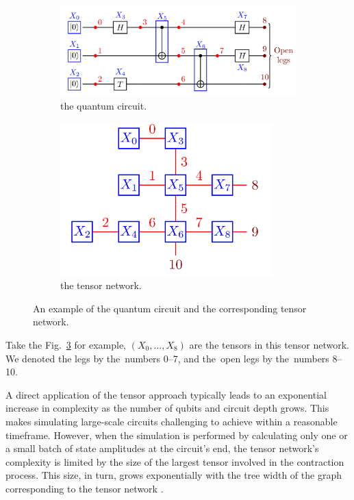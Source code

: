 \begin{figure}
    \centering
    \begin{subfigure}{0.5\textwidth}
        \centering
        \includegraphics[width=\textwidth]{images/6_3_circ.png}
        \caption{the quantum circuit.}
        \label{6_3_circ}
    \end{subfigure}
    \begin{subfigure}{0.4\textwidth}
        \centering
        \includegraphics[width=0.9\textwidth]{images/6_3_tn.png}
        \caption{the tensor network.}
        \label{6_3_tn}
    \end{subfigure}
    \caption{An example of the quantum circuit and the corresponding tensor network.}
    \label{fig:6_3_tn_circ}
\end{figure}

Take the Fig.~\ref{fig:6_3_tn_circ} for example, $(X_{0}, \ldots, X_{8})$ are the tensors in this tensor network. We denoted the legs by the~numbers 0--7, and the~open legs by the~numbers 8--10.

A direct application of the tensor approach typically leads to an exponential increase in complexity as the number of qubits and circuit depth grows. This makes simulating large-scale circuits challenging to achieve within a reasonable timeframe. However, when the simulation is performed by calculating only one or a small batch of state amplitudes at the circuit's end, the tensor network's complexity is limited by the size of the largest tensor involved in the contraction process. This size, in turn, grows exponentially with the tree width of the graph corresponding to the tensor network \cite{Markov_2008}.

